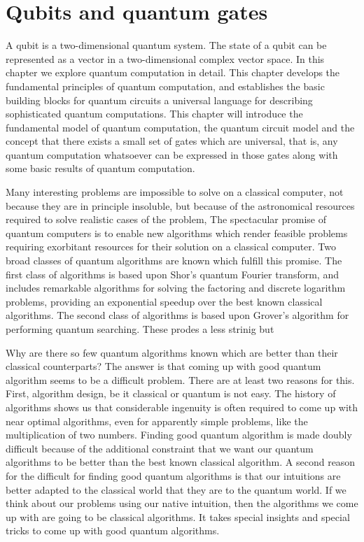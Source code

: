 \chapter{Qubits and quantum gates}
A qubit is a two-dimensional quantum system. The state of a qubit can be represented as a vector in a two-dimensional complex vector space. In this chapter we explore quantum computation in detail. This chapter develops the fundamental principles of quantum computation, and establishes the basic building blocks for quantum circuits a universal language for describing sophisticated quantum computations. This chapter will introduce the fundamental model of quantum computation, the quantum circuit model and the concept that there exists a small set of gates which are universal, that is, any quantum computation whatsoever can be expressed in those gates along with some basic results of quantum computation. 

Many interesting problems are impossible to solve on a classical computer, not because they are in principle insoluble, but because of the astronomical resources required to solve realistic cases of the problem, The spectacular promise of quantum computers is to enable new algorithms which render feasible problems requiring exorbitant resources for their solution on a classical computer. Two broad classes of quantum algorithms are known which fulfill this promise. The first class of algorithms is based upon Shor's quantum Fourier transform, and includes remarkable algorithms for solving the factoring and discrete logarithm problems, providing an exponential speedup over the best known classical algorithms. The second class of algorithms is based upon Grover's algorithm for performing quantum searching. These prodes a less strinig but 


Why are there so few quantum algorithms known which are better than their classical counterparts? The answer is that coming up with good quantum algorithm seems to be a difficult problem. There are at least two reasons for this. First, algorithm design, be it classical or quantum is not easy. The history of algorithms shows us that considerable ingenuity is often required to come up with near optimal algorithms, even for apparently simple problems, like the multiplication of two numbers. Finding good quantum algorithm is made doubly difficult because of the additional constraint that we want our quantum algorithms to be better than the best known classical algorithm. A second reason for the difficult for finding good quantum algorithms is that our intuitions are better adapted to the classical world that they are to the quantum world. If we think about our problems using our native intuition, then the algorithms we come up with are going to be classical algorithms. It takes special insights and special tricks to come up with good quantum algorithms.


